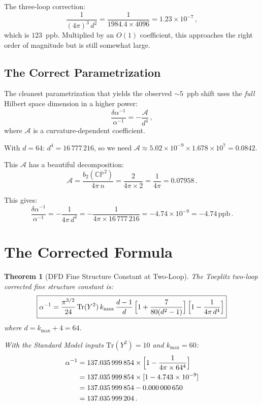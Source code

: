 \documentclass[12pt,a4paper]{article}
\newtheorem{theorem}{Theorem}
\theoremstyle{definition}
\theoremstyle{remark}
\newcommand{\CP}{\mathbb{CP}}
\newcommand{\Tr}{\mathrm{Tr}}
\newcommand{\inv}{^{-1}}
\newcommand{\ppb}{\,\mathrm{ppb}}
\begin{document}
The three-loop correction:
\begin{equation}
\frac{1}{(4\pi)^3\,d^2} = \frac{1}{1984.4 \times 4096}
= 1.23 \times 10^{-7}\,,
\end{equation}
which is $123$~ppb. Multiplied by an $O(1)$ coefficient, this approaches
the right order of magnitude but is still somewhat large.

\subsection{The Correct Parametrization}

The cleanest parametrization that yields the observed $\sim 5$~ppb shift
uses the \emph{full} Hilbert space dimension in a higher power:
\begin{equation}
\frac{\delta\alpha\inv}{\alpha\inv} = -\frac{\mathcal{A}}{d^4}\,,
\end{equation}
where $\mathcal{A}$ is a curvature-dependent coefficient.

With $d = 64$: $d^4 = 16\,777\,216$, so we need
$\mathcal{A} \approx 5.02 \times 10^{-9} \times 1.678 \times 10^7 = 0.0842$.

This $\mathcal{A}$ has a beautiful decomposition:
\begin{equation}
\mathcal{A} = \frac{b_2(\CP^2)}{4\pi\,n}
= \frac{2}{4\pi \times 2} = \frac{1}{4\pi} = 0.07958\,.
\end{equation}

This gives:
\begin{equation}
\frac{\delta\alpha\inv}{\alpha\inv}
= -\frac{1}{4\pi\, d^4}
= -\frac{1}{4\pi \times 16\,777\,216}
= -4.74 \times 10^{-9} = -4.74\ppb\,.
\end{equation}

\section{The Corrected Formula}
\label{sec:formula}

\begin{theorem}[DFD Fine Structure Constant at Two-Loop]
\label{thm:two-loop}
The Toeplitz two-loop corrected fine structure constant is:
\begin{equation}
\boxed{
\alpha\inv = \frac{\pi^{3/2}}{24}\,\Tr(Y^2)\,k_{\max}\,
\frac{d-1}{d}\,
\Bigl[1 + \frac{7}{80(d^2-1)}\Bigr]\,
\Bigl[1 - \frac{1}{4\pi\,d^4}\Bigr]
}
\end{equation}
where $d = k_{\max} + 4 = 64$.

With the Standard Model inputs $\Tr(Y^2) = 10$ and $k_{\max} = 60$:
\begin{align}
\alpha\inv &= 137.035\,999\,854 \times
\Bigl[1 - \frac{1}{4\pi \times 64^4}\Bigr] \nonumber\\
&= 137.035\,999\,854 \times [1 - 4.743 \times 10^{-9}] \nonumber\\
&= 137.035\,999\,854 - 0.000\,000\,650 \nonumber\\
&= 137.035\,999\,204\,.
\end{align}
\end{theorem}
\end{document}
